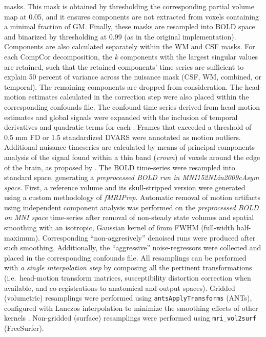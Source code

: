 \documentclass[
]{article}
\begin{document}
\begin{description}
masks. This mask is obtained by thresholding the corresponding partial
volume map at 0.05, and it ensures components are not extracted from
voxels containing a minimal fraction of GM. Finally, these masks are
resampled into BOLD space and binarized by thresholding at 0.99 (as in
the original implementation). Components are also calculated separately
within the WM and CSF masks. For each CompCor decomposition, the
\emph{k} components with the largest singular values are retained, such
that the retained components' time series are sufficient to explain 50
percent of variance across the nuisance mask (CSF, WM, combined, or
temporal). The remaining components are dropped from consideration. The
head-motion estimates calculated in the correction step were also placed
within the corresponding confounds file. The confound time series
derived from head motion estimates and global signals were expanded with
the inclusion of temporal derivatives and quadratic terms for each
\citep{confounds_satterthwaite_2013}. Frames that exceeded a threshold
of 0.5 mm FD or 1.5 standardized DVARS were annotated as motion
outliers. Additional nuisance timeseries are calculated by means of
principal components analysis of the signal found within a thin band
(\emph{crown}) of voxels around the edge of the brain, as proposed by
\citep{patriat_improved_2017}. The BOLD time-series were resampled into
standard space, generating a \emph{preprocessed BOLD run in
MNI152NLin2009cAsym space}. First, a reference volume and its
skull-stripped version were generated using a custom methodology of
\emph{fMRIPrep}. Automatic removal of motion artifacts using independent
component analysis \citep[ICA-AROMA,][]{aroma} was performed on the
\emph{preprocessed BOLD on MNI space} time-series after removal of
non-steady state volumes and spatial smoothing with an isotropic,
Gaussian kernel of 6mm FWHM (full-width half-maximum). Corresponding
``non-aggresively'' denoised runs were produced after such smoothing.
Additionally, the ``aggressive'' noise-regressors were collected and
placed in the corresponding confounds file. All resamplings can be
performed with \emph{a single interpolation step} by composing all the
pertinent transformations (i.e.~head-motion transform matrices,
susceptibility distortion correction when available, and
co-registrations to anatomical and output spaces). Gridded (volumetric)
resamplings were performed using \texttt{antsApplyTransforms} (ANTs),
configured with Lanczos interpolation to minimize the smoothing effects
of other kernels \citep{lanczos}. Non-gridded (surface) resamplings were
performed using \texttt{mri\_vol2surf} (FreeSurfer).
\end{description}
\end{document}

